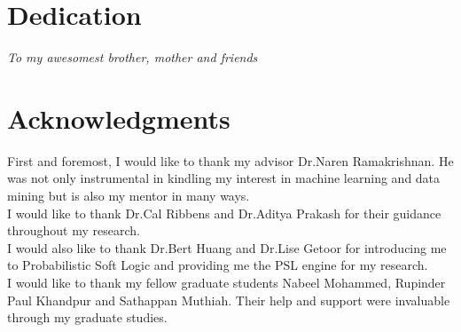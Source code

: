 \documentclass[11pt]{report}
\begin{document}
\chapter*{Dedication}
\vspace*{\fill}
\begin{center}
\Large\textit{To my awesomest brother, mother and friends}
\end{center}
\vspace{\fill}

\chapter*{Acknowledgments}
\vspace*{\fill}
\Large{First and foremost, I would like to thank my advisor Dr.Naren Ramakrishnan. He was not only instrumental in kindling my interest in machine learning and data mining but is also my mentor in many ways.\\
I would like to thank Dr.Cal Ribbens and Dr.Aditya Prakash for their guidance throughout my research.\\
I would also like to thank Dr.Bert Huang and Dr.Lise Getoor for introducing me to Probabilistic Soft Logic and providing me the PSL engine for my research.\\
I would like to thank my fellow graduate students Nabeel Mohammed, Rupinder Paul Khandpur and Sathappan Muthiah. Their help and support were invaluable through my graduate studies.
}
\vspace{\fill}

\tableofcontents
\pagebreak

\listoffigures
\pagebreak

\listoftables
\pagebreak

\pagestyle{myheadings}







\cleardoublepage



\end{document}
